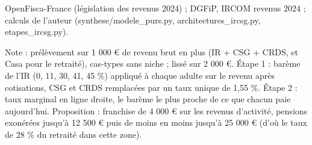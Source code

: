 OpenFisca-France (législation des revenus 2024) ; DGFiP, IRCOM revenus 2024 ; calculs de l'auteur (synthese/modele\_purs.py, architectures\_ircsg.py, etapes\_ircsg.py).\par Note : prélèvement sur 1 000 \euro{} de revenu brut en plus (IR + CSG + CRDS, et Casa pour le retraité), cas-types sans niche ; lissé sur 2 000 \euro{}. Étape 1 : barème de l'IR (0, 11, 30, 41, 45 \%) appliqué à chaque adulte sur le revenu après cotisations, CSG et CRDS remplacées par un taux unique de 1,55 \%. Étape 2 : taux marginal en ligne droite, le barème le plus proche de ce que chacun paie aujourd'hui. Proposition : franchise de 4 000 \euro{} sur les revenus d'activité, pensions exonérées jusqu'à 12 500 \euro{} puis de moins en moins jusqu'à 25 000 \euro{} (d'où le taux de 28 \% du retraité dans cette zone).
